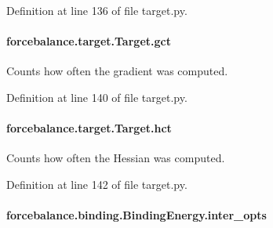 Definition at line 136 of file target.\-py.

\hypertarget{classforcebalance_1_1target_1_1Target_aa625ac88c6744eb14ef281d9496d0dbb}{
\paragraph[{gct}]{\setlength{\rightskip}{0pt plus 5cm}forcebalance.\-target.\-Target.\-gct\hspace{0.3cm}{\ttfamily [inherited]}}}\label{classforcebalance_1_1target_1_1Target_aa625ac88c6744eb14ef281d9496d0dbb}


Counts how often the gradient was computed. 



Definition at line 140 of file target.\-py.

\hypertarget{classforcebalance_1_1target_1_1Target_a5b5a42f78052b47f29ed4b940c6111a1}{
\paragraph[{hct}]{\setlength{\rightskip}{0pt plus 5cm}forcebalance.\-target.\-Target.\-hct\hspace{0.3cm}{\ttfamily [inherited]}}}\label{classforcebalance_1_1target_1_1Target_a5b5a42f78052b47f29ed4b940c6111a1}


Counts how often the Hessian was computed. 



Definition at line 142 of file target.\-py.

\hypertarget{classforcebalance_1_1binding_1_1BindingEnergy_a9d1f28fc62222da17c0fd12593042f10}{
\paragraph[{inter\-\_\-opts}]{\setlength{\rightskip}{0pt plus 5cm}forcebalance.\-binding.\-Binding\-Energy.\-inter\-\_\-opts}}\label{classforcebalance_1_1binding_1_1BindingEnergy_a9d1f28fc62222da17c0fd12593042f10}



